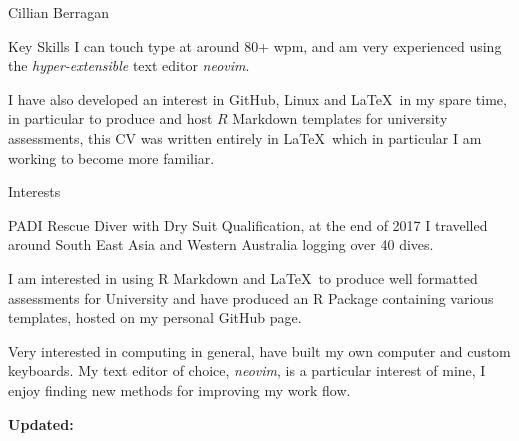 \documentclass{scrartcl}
\begin{document}
\begin{cv}{Cillian Berragan}
\begin{cvlist}{Key Skills}
        I can touch type at around 80+ wpm, and am very experienced using the \textit{hyper-extensible} text editor \textit{neovim}.

\end{cvlist}

    \small I have also developed an interest in GitHub, Linux and \LaTeX\ in my spare time, in particular to produce and host $R$ Markdown templates for university assessments, this CV was written entirely in \LaTeX\ which in particular I am working to become more familiar.

\begin{cvlist}{Interests}
    \item[]
    PADI Rescue Diver with Dry Suit Qualification, at the end of 2017 I travelled around South East Asia and Western Australia logging over 40 dives.

    I am interested in using R Markdown and \LaTeX\ to produce well formatted assessments for University and have produced an R Package containing various templates, hosted on my personal GitHub page.

    Very interested in computing in general, have built my own computer and custom keyboards. My text editor of choice, \textit{neovim}, is a particular interest of mine, I enjoy finding new methods for improving my work flow.

\end{cvlist}

\vfill

\small \textbf{Updated:} \end{cv}
\end{document}
